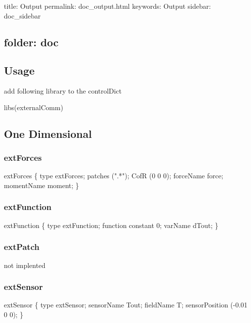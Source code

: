 

 title\+: Output permalink\+: doc\+\_\+output.\+html keywords\+: Output sidebar\+: doc\+\_\+sidebar \subsection*{folder\+: doc }

\subsection*{Usage}

add following library to the control\+Dict


\begin{DoxyCode}
libs(externalComm)
\end{DoxyCode}


\subsection*{One Dimensional}

\subsubsection*{ext\+Forces}


\begin{DoxyCode}
extForces
\{
    type extForces;
    patches (".*");
    CofR  (0 0 0);
    forceName force;
    momentName moment;
\}
\end{DoxyCode}


\subsubsection*{ext\+Function}


\begin{DoxyCode}
extFunction
\{
    type extFunction;
    function constant 0;
    varName dTout;
\}
\end{DoxyCode}


\subsubsection*{ext\+Patch}

not implented

\subsubsection*{ext\+Sensor}


\begin{DoxyCode}
extSensor
\{
    type extSensor;
    sensorName Tout;
    fieldName T;
    sensorPosition (-0.01 0 0);
\}
\end{DoxyCode}
 